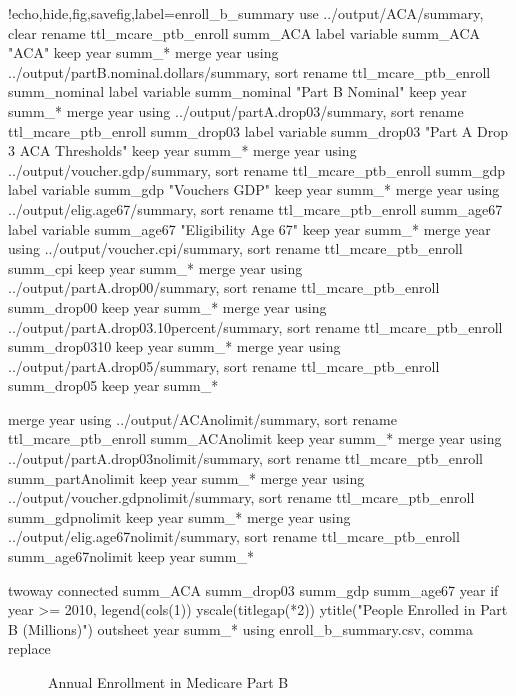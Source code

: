 \documentclass{article}
\begin{document}
\begin{Statacode}{!echo,hide,fig,savefig,label=enroll_b_summary}
use ../output/ACA/summary, clear
rename ttl_mcare_ptb_enroll summ_ACA
label variable summ_ACA "ACA"
keep year summ_*
merge year using ../output/partB.nominal.dollars/summary, sort
rename ttl_mcare_ptb_enroll summ_nominal
label variable summ_nominal "Part B Nominal"
keep year summ_*
merge year using ../output/partA.drop03/summary, sort
rename ttl_mcare_ptb_enroll summ_drop03
label variable summ_drop03 "Part A Drop 3 ACA Thresholds"
keep year summ_*
merge year using ../output/voucher.gdp/summary, sort
rename ttl_mcare_ptb_enroll summ_gdp
label variable summ_gdp "Vouchers GDP"
keep year summ_*
merge year using ../output/elig.age67/summary, sort
rename ttl_mcare_ptb_enroll summ_age67
label variable summ_age67 "Eligibility Age 67"
keep year summ_*
merge year using ../output/voucher.cpi/summary, sort
rename ttl_mcare_ptb_enroll summ_cpi
keep year summ_*
merge year using ../output/partA.drop00/summary, sort
rename ttl_mcare_ptb_enroll summ_drop00
keep year summ_*
merge year using ../output/partA.drop03.10percent/summary, sort
rename ttl_mcare_ptb_enroll summ_drop0310
keep year summ_*
merge year using ../output/partA.drop05/summary, sort
rename ttl_mcare_ptb_enroll summ_drop05
keep year summ_*

merge year using ../output/ACAnolimit/summary, sort
rename ttl_mcare_ptb_enroll summ_ACAnolimit
keep year summ_*
merge year using ../output/partA.drop03nolimit/summary, sort
rename ttl_mcare_ptb_enroll summ_partAnolimit
keep year summ_*
merge year using ../output/voucher.gdpnolimit/summary, sort
rename ttl_mcare_ptb_enroll summ_gdpnolimit
keep year summ_*
merge year using ../output/elig.age67nolimit/summary, sort
rename ttl_mcare_ptb_enroll summ_age67nolimit
keep year summ_*

twoway connected summ_ACA summ_drop03 summ_gdp summ_age67 year if year >= 2010, legend(cols(1)) yscale(titlegap(*2)) ytitle("People Enrolled in Part B (Millions)")
outsheet year summ_* using enroll_b_summary.csv, comma replace
\end{Statacode}

\begin{figure}[ht]
\centering
{}
\caption{Annual Enrollment in Medicare Part B}
\end{figure}
\end{document}
